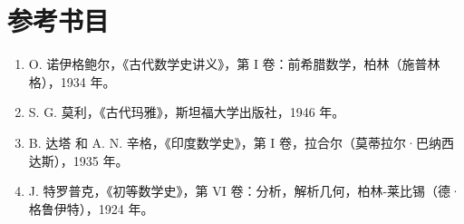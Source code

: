 \section*{参考书目}
{}

\begin{enumerate}
\def\labelenumi{\arabic{enumi}.}
\item
  O. 诺伊格鲍尔，《古代数学史讲义》，第 I 卷：前希腊数学，柏林（施普林格），1934 年。
\item
  S. G. 莫利，《古代玛雅》，斯坦福大学出版社，1946 年。
\item
  B. 达塔 和 A. N. 辛格，《印度数学史》，第 I 卷，拉合尔（莫蒂拉尔·巴纳西达斯），1935 年。
\item
  J. 特罗普克，《初等数学史》，第 VI 卷：分析，解析几何，柏林-莱比锡（德·格鲁伊特），1924 年。
\end{enumerate}
